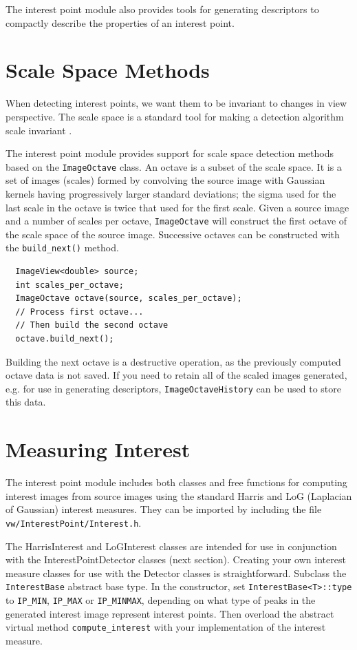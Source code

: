 The interest point module also provides tools for generating descriptors
to compactly describe the properties of an interest point.

\section{Scale Space Methods}
When detecting interest points, we want them to be invariant to changes in
view perspective. The scale space is a standard tool for making a
detection algorithm scale invariant \cite{lindeberg98}.

The interest point module provides support for scale space detection methods
based on the {\tt ImageOctave} class. An octave is a subset of the scale space.
It is a set of images (scales) formed by convolving the source image
with Gaussian kernels having progressively larger
standard deviations; the sigma used for the last scale in the octave is
twice that used for the first scale. Given a source image and a number of
scales per octave, {\tt ImageOctave} will construct the first octave of the
scale space of the source image. Successive octaves can be constructed
with the \verb#build_next()# method.

\begin{verbatim}
  ImageView<double> source;
  int scales_per_octave;
  ImageOctave octave(source, scales_per_octave);
  // Process first octave...
  // Then build the second octave
  octave.build_next();
\end{verbatim}

Building the next octave is a destructive operation, as the previously
computed octave data is not saved. If you need to retain all of the
scaled images generated, e.g. for use in generating descriptors,
{\tt ImageOctaveHistory} can be used to store this data.

\section{Measuring Interest}
The interest point module includes both classes and free functions
for computing interest images from source images using the
standard Harris \cite{harris88} and LoG (Laplacian of Gaussian)
interest measures. They can be imported by including the file
{\tt vw/InterestPoint/Interest.h}.

The HarrisInterest and LoGInterest classes are intended for use in
conjunction with the InterestPointDetector classes (next
section). Creating your own interest measure classes for use with the
Detector classes is straightforward.  Subclass the \verb#InterestBase#
abstract base type. In the constructor, set
\verb#InterestBase<T>::type# to \verb#IP_MIN#, \verb#IP_MAX# or
\verb#IP_MINMAX#, depending on what type of peaks in the generated
interest image represent interest points. Then overload the abstract
virtual method \verb#compute_interest# with your implementation of the
interest measure.

